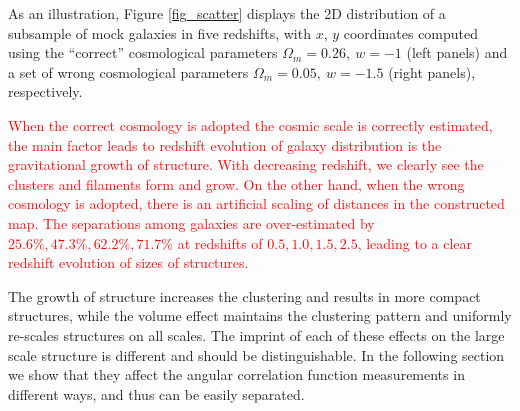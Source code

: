 \documentclass[iop]{emulateapj}
\newcommand{\hMsun}{{\ifmmode{h^{-1}{\rm
        {M_{\odot}}}}\else{$h^{-1}{\rm{M_{\odot}}}$~}\fi}}
\newcommand{\scr}{\textcolor{red}}
\begin{document}
As an illustration, Figure \ref{fig_scatter} displays the 2D distribution of a subsample of mock galaxies in five redshifts,
with $x$, $y$ coordinates computed using the ``correct'' cosmological parameters $\Omega_m=0.26,\ w=-1$ (left panels) 
and a set of wrong cosmological parameters $\Omega_m=0.05,\ w=-1.5$ (right panels), respectively.

\scr{When the correct cosmology is adopted the cosmic scale is correctly estimated,
the main factor leads to redshift evolution of galaxy distribution is the gravitational growth of structure.
With decreasing redshift, we clearly see the clusters and filaments form and grow.
On the other hand, when the wrong cosmology is adopted, there is an artificial scaling of distances in the constructed map.
The separations among galaxies are over-estimated by 
$25.6\%,47.3\%,62.2\%,71.7\%$ at redshifts of $0.5,1.0,1.5,2.5$,
leading to a clear redshift evolution of sizes of structures.}

The growth of structure increases the clustering and results in more compact structures,
while the volume effect maintains the clustering pattern and uniformly re-scales structures on all scales.
The imprint of each of these effects on the large scale structure is different and should be distinguishable.
In the following section we show that they affect the angular correlation function measurements in different ways, 
and thus can be easily separated.





\end{document}
